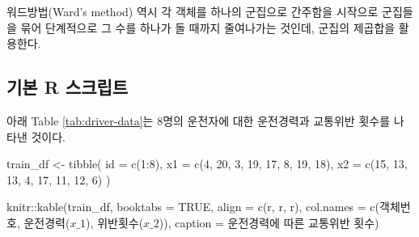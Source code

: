 \documentclass[
]{book}
\newenvironment{Shaded}{\begin{snugshade}}{\end{snugshade}}
\newcommand{\AttributeTok}[1]{\textcolor[rgb]{0.77,0.63,0.00}{#1}}
\newcommand{\ConstantTok}[1]{\textcolor[rgb]{0.00,0.00,0.00}{#1}}
\newcommand{\DecValTok}[1]{\textcolor[rgb]{0.00,0.00,0.81}{#1}}
\newcommand{\FunctionTok}[1]{\textcolor[rgb]{0.00,0.00,0.00}{#1}}
\newcommand{\NormalTok}[1]{#1}
\newcommand{\OtherTok}[1]{\textcolor[rgb]{0.56,0.35,0.01}{#1}}
\newcommand{\SpecialCharTok}[1]{\textcolor[rgb]{0.00,0.00,0.00}{#1}}
\newcommand{\StringTok}[1]{\textcolor[rgb]{0.31,0.60,0.02}{#1}}
\begin{document}
워드방법(Ward's method) 역시 각 객체를 하나의 군집으로 간주함을 시작으로 군집들을 묶어 단계적으로 그 수를 하나가 돌 때까지 줄여나가는 것인데, 군집의 제곱합을 활용한다.

\hypertarget{ward-method-basic-script}{%
\subsection{기본 R 스크립트}\label{ward-method-basic-script}}

아래 Table \ref{tab:driver-data}는 8명의 운전자에 대한 운전경력과 교통위반 횟수를 나타낸 것이다.

\begin{Shaded}
\begin{Highlighting}[]
\NormalTok{train\_df }\OtherTok{\textless{}{-}} \FunctionTok{tibble}\NormalTok{(}
  \AttributeTok{id =} \FunctionTok{c}\NormalTok{(}\DecValTok{1}\SpecialCharTok{:}\DecValTok{8}\NormalTok{),}
  \AttributeTok{x1 =} \FunctionTok{c}\NormalTok{(}\DecValTok{4}\NormalTok{, }\DecValTok{20}\NormalTok{, }\DecValTok{3}\NormalTok{, }\DecValTok{19}\NormalTok{, }\DecValTok{17}\NormalTok{, }\DecValTok{8}\NormalTok{, }\DecValTok{19}\NormalTok{, }\DecValTok{18}\NormalTok{),}
  \AttributeTok{x2 =} \FunctionTok{c}\NormalTok{(}\DecValTok{15}\NormalTok{, }\DecValTok{13}\NormalTok{, }\DecValTok{13}\NormalTok{, }\DecValTok{4}\NormalTok{, }\DecValTok{17}\NormalTok{, }\DecValTok{11}\NormalTok{, }\DecValTok{12}\NormalTok{, }\DecValTok{6}\NormalTok{)}
\NormalTok{)}

\NormalTok{knitr}\SpecialCharTok{::}\FunctionTok{kable}\NormalTok{(train\_df, }\AttributeTok{booktabs =} \ConstantTok{TRUE}\NormalTok{,}
             \AttributeTok{align =} \FunctionTok{c}\NormalTok{(}\StringTok{\textquotesingle{}r\textquotesingle{}}\NormalTok{, }\StringTok{\textquotesingle{}r\textquotesingle{}}\NormalTok{, }\StringTok{\textquotesingle{}r\textquotesingle{}}\NormalTok{),}
             \AttributeTok{col.names =} \FunctionTok{c}\NormalTok{(}\StringTok{\textquotesingle{}객체번호\textquotesingle{}}\NormalTok{, }\StringTok{\textquotesingle{}운전경력($x\_1$)\textquotesingle{}}\NormalTok{, }\StringTok{\textquotesingle{}위반횟수($x\_2$)\textquotesingle{}}\NormalTok{),}
             \AttributeTok{caption =} \StringTok{\textquotesingle{}운전경력에 따른 교통위반 횟수\textquotesingle{}}\NormalTok{)}
\end{Highlighting}
\end{Shaded}
\end{document}
